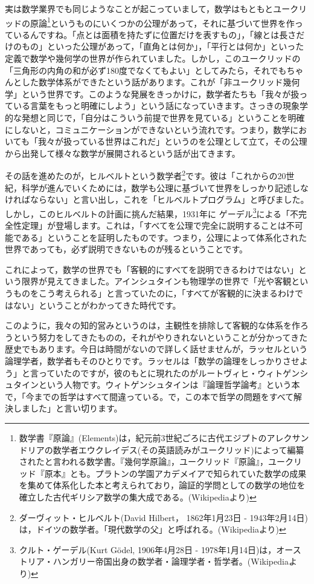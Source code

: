 \documentclass{ltjsbook}
\begin{document}
実は数学業界でも同じようなことが起こっていまして，数学はもともとユークリッドの原論\footnote{数学書『原論』(Elements)は，紀元前3世紀ごろに古代エジプトのアレクサンドリアの数学者エウクレイデス(その英語読みがユークリッド)によって編纂されたと言われる数学書。『幾何学原論』，ユークリッド『原論』，ユークリッド『原本』とも。プラトンの学園アカデメイアで知られていた数学の成果を集めて体系化した本と考えられており，論証的学問としての数学の地位を確立した古代ギリシア数学の集大成である。(Wikipediaより)}というものにいくつかの公理があって，それに基づいて世界を作っているんですね。「点とは面積を持たずに位置だけを表すもの」，「線とは長さだけのもの」といった公理があって，「直角とは何か」，「平行とは何か」といった定義で数学や幾何学の世界が作られていました。しかし，このユークリッドの「三角形の内角の和が必ず180度でなくてもよい」としてみたら，それでもちゃんとした数学体系ができたという話があります。これが「非ユークリッド幾何学」という世界です。このような発展をきっかけに，数学者たちも「我々が扱っている言葉をもっと明確にしよう」という話になっていきます。さっきの現象学的な発想と同じで，「自分はこういう前提で世界を見ている」ということを明確にしないと，コミュニケーションができないという流れです。つまり，数学においても「我々が扱っている世界はこれだ」というのを公理として立て，その公理から出発して様々な数学が展開されるという話が出てきます。

その話を進めたのが，ヒルベルトという数学者\footnote{ダーヴィット・ヒルベルト(David Hilbert， 1862年1月23日 - 1943年2月14日)は，ドイツの数学者。「現代数学の父」と呼ばれる。(Wikipediaより)}です。彼は「これからの20世紀，科学が進んでいくためには，数学も公理に基づいて世界をしっかり記述しなければならない」と言い出し，これを「ヒルベルトプログラム」と呼びました。しかし，このヒルベルトの計画に挑んだ結果，1931年に ゲーデル\footnote{クルト・ゲーデル(Kurt Gödel, 1906年4月28日 - 1978年1月14日)は，オーストリア・ハンガリー帝国出身の数学者・論理学者・哲学者。(Wikipediaより)}による「不完全性定理」が登場します。これは，「すべてを公理で完全に説明することは不可能である」ということを証明したものです。つまり，公理によって体系化された世界であっても，必ず説明できないものが残るということです。

これによって，数学の世界でも「客観的にすべてを説明できるわけではない」という限界が見えてきました。アインシュタインも物理学の世界で「光や客観というものをこう考えられる」と言っていたのに，「すべてが客観的に決まるわけではない」ということがわかってきた時代です。

このように，我々の知的営みというのは，主観性を排除して客観的な体系を作ろうという努力をしてきたものの，それがやりきれないということが分かってきた歴史でもあります。今日は時間がないので詳しく話せませんが，ラッセルという論理学者，数学者もそのひとりです。ラッセルは「数学の論理をしっかりさせよう」と言っていたのですが，彼のもとに現れたのがルートヴィヒ・ウィトゲンシュタインという人物です。ウィトゲンシュタインは『論理哲学論考』という本\parencite{Wittgenstein1}で，「今までの哲学はすべて間違っている。で，この本で哲学の問題をすべて解決しました」と言い切ります。
\end{document}

